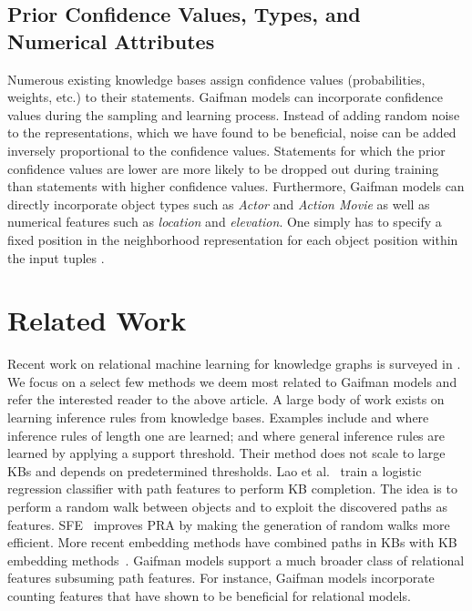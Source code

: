 \documentclass{article}
\begin{document}
\subsection{Prior Confidence Values, Types, and Numerical Attributes}

Numerous existing knowledge bases assign confidence values (probabilities, weights, etc.) to their statements. Gaifman models can incorporate confidence values during the sampling  and learning process. Instead of adding random noise to the representations, which we have found to be beneficial,  noise can be added inversely proportional to the confidence values. Statements for which the prior confidence values are lower are more likely to be dropped out during training than statements with higher confidence values. 
Furthermore, Gaifman models can directly incorporate object types such as \textsl{Actor} and \textsl{Action Movie} as well as numerical features such as \textsl{location} and \textsl{elevation}. One simply has to specify a fixed position in the neighborhood representation  for each object position within the input tuples . 


\section{Related Work}

Recent work on relational machine learning for knowledge graphs is surveyed in \cite{Nickel:2016}. We focus on a select few methods we deem most related to Gaifman models and refer the interested reader to the above article. 
A large body of work exists on learning inference rules from knowledge bases. 
Examples include \cite{yates:2007} and \cite{berant:2011} where inference rules of length one are learned; and \cite{Schoenmackers:2010} where general inference rules are learned by applying a support threshold. Their method
does not scale to large KBs and depends on predetermined thresholds. 
Lao et al.~\cite{Lao:2011} train a logistic regression classifier with path features to perform KB completion.  The idea is to perform a random walk between objects and to exploit the discovered paths as features. SFE~\cite{Gardner:2015} improves PRA by making the generation of random walks more efficient. More recent embedding methods have combined paths in KBs with KB embedding methods~\cite{DBLP:conf/emnlp/LinLLSRL15}.  Gaifman models support a much broader class of relational features subsuming path features. For instance, Gaifman models incorporate counting features that have shown to be beneficial for relational models.  
\end{document}
